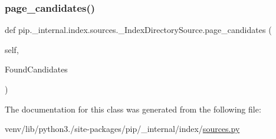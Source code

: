 \mbox{\label{classpip_1_1__internal_1_1index_1_1sources_1_1__IndexDirectorySource_a6e9e0eda2dc96df1aa08017a115816e6}} 
\subsubsection{\texorpdfstring{page\+\_\+candidates()}{page\_candidates()}}
{\footnotesize\ttfamily def pip.\+\_\+internal.\+index.\+sources.\+\_\+\+Index\+Directory\+Source.\+page\+\_\+candidates (\begin{DoxyParamCaption}\item[{}]{self,  }\item[{}]{Found\+Candidates }\end{DoxyParamCaption})}



The documentation for this class was generated from the following file\+:\begin{DoxyCompactItemize}
\item 
venv/lib/python3./site-\/packages/pip/\+\_\+internal/index/\hyperlink{sources_8py}{sources.\+py}\end{DoxyCompactItemize}

